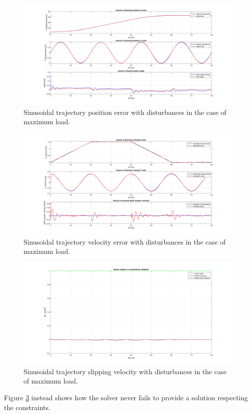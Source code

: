 \begin{figure}
    \centering
    \includegraphics[width=1\linewidth]{Images/Robustness analysis/maximum load/sinusoidal trajectory/Position_error.jpg}
    \caption{Sinusoidal trajectory position error with disturbances in the case of maximum load.}
    \label{fig:Sinusoidal trajectory position error with disturbances in the case of maximum load}
\end{figure}

\begin{figure}
    \centering
    \includegraphics[width=1\linewidth]{Images/Robustness analysis/maximum load/sinusoidal trajectory/Velocity_error.jpg}
    \caption{Sinusoidal trajectory velocity error with disturbances in the case of maximum load.}
    \label{fig:Sinusoidal trajectory velocity error with disturbances in the case of maximum load}
\end{figure}

\begin{figure}
    \centering
    \includegraphics[width=1\linewidth]{Images/Robustness analysis/maximum load/sinusoidal trajectory/Slipping_velocity.jpg}
    \caption{Sinusoidal trajectory slipping velocity with disturbances in the case of maximum load.}
    \label{fig:Sinusoidal trajectory slipping velocity with disturbances in the case of maximum load}
\end{figure}

Figure \ref{fig:Sinusoidal trajectory slipping velocity with disturbances in the case of maximum load} instead shows how the solver never fails to provide a solution respecting the constraints.